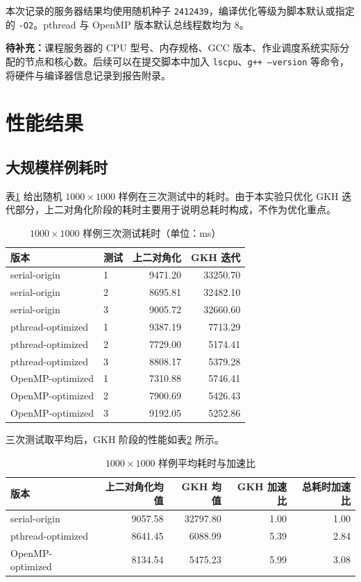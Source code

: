 ﻿\documentclass[UTF8,a4paper]{ctexart}
\begin{document}
本次记录的服务器结果均使用随机种子 \texttt{2412439}，编译优化等级为脚本默认或指定的 \texttt{-O2}。pthread 与 OpenMP 版本默认总线程数均为 8。

\textbf{待补充：}课程服务器的 CPU 型号、内存规格、GCC 版本、作业调度系统实际分配的节点和核心数。后续可以在提交脚本中加入 \texttt{lscpu}、\texttt{g++ --version} 等命令，将硬件与编译器信息记录到报告附录。

\section{性能结果}

\subsection{大规模样例耗时}

表\ref{tab:large_raw} 给出随机 $1000\times1000$ 样例在三次测试中的耗时。由于本实验只优化 GKH 迭代部分，上二对角化阶段的耗时主要用于说明总耗时构成，不作为优化重点。

\begin{table}[H]
\centering
\caption{$1000\times1000$ 样例三次测试耗时（单位：ms）}
\label{tab:large_raw}
\begin{tabular}{llrr}
\toprule
版本 & 测试 & 上二对角化 & GKH 迭代 \\
\midrule
serial-origin & 1 & 9471.20 & 33250.70 \\
serial-origin & 2 & 8695.81 & 32482.10 \\
serial-origin & 3 & 9005.72 & 32660.60 \\
\midrule
pthread-optimized & 1 & 9387.19 & 7713.29 \\
pthread-optimized & 2 & 7729.00 & 5174.41 \\
pthread-optimized & 3 & 8808.17 & 5379.28 \\
\midrule
OpenMP-optimized & 1 & 7310.88 & 5746.41 \\
OpenMP-optimized & 2 & 7900.69 & 5426.43 \\
OpenMP-optimized & 3 & 9192.05 & 5252.86 \\
\bottomrule
\end{tabular}
\end{table}

三次测试取平均后，GKH 阶段的性能如表\ref{tab:avg_speedup} 所示。

\begin{table}[H]
\centering
\caption{$1000\times1000$ 样例平均耗时与加速比}
\label{tab:avg_speedup}
\begin{tabular}{lrrrr}
\toprule
版本 & 上二对角化均值 & GKH 均值 & GKH 加速比 & 总耗时加速比 \\
\midrule
serial-origin & 9057.58 & 32797.80 & 1.00 & 1.00 \\
pthread-optimized & 8641.45 & 6088.99 & 5.39 & 2.84 \\
OpenMP-optimized & 8134.54 & 5475.23 & 5.99 & 3.08 \\
\bottomrule
\end{tabular}
\end{table}
\end{document}
